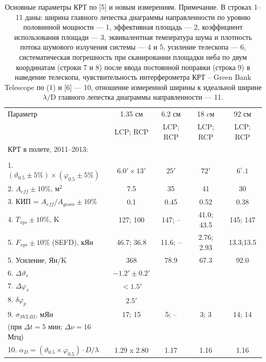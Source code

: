 \begin{table}
\caption{Основные параметры КРТ по [5] и новым измерениям.
\tiny{Примечание. В строках 1--11 даны: ширина главного лепестка диаграммы направленности по уровню
половинной мощности --- 1, эффективная площадь --- 2, коэффициент использования площади --- 3,
эквивалентная температура шума и плотность потока шумового излучения системы --- 4 и 5, усиление
телескопа --- 6, систематическая погрешность при сканировании площадки неба
по двум координатам (строки 7 и 8) после ввода постоянной поправки (строка 9) в наведение телескопа,
чувствительность интерферометра КРТ – Green Bank Telescope по (1) и [6] --- 10, отношение
измеренной ширины к идеальной ширине $\lambda/\text{D}$ главного лепестка диаграммы направленности
--- 11.}}
\bigskip
\label{tab:srt_params3}
\centering
    \begin{SingleSpace}
    \tiny
        \begin{tabular}{lcccc}
        \toprule
Параметр              & 1.35 см  & 6.2 см   & 18 cм    & 92 см\\
                      & LCP; RCP & LCP; RCP & LCP; RCP & LCP; RCP\\

        \midrule
КРТ в полете, 2011--2013: & & & &\\
                       & & & &\\
1. $(\vartheta_{0.5} \pm 5 \%) \times (\varphi_{0.5} \pm 5 \%)$ & $6.0' \times 13'$ & $25'$ &$72'$
 & $6^\circ.1$ \\
2. $A_{eff} \pm 10\%$, м$^2$                  & 7.5        & 35     & 41         & 30\\
3. КИП = $A_{eff}/A_{geom} \pm 10\%$          & 0.1        & 0.45   & 0.52       & 0.38\\
4. $T_{sys} \pm 10\%$, K                      & 127; 100   & 147;  -- & 41.0; 43.5 & 145; 147\\
5. $F_{sys} \pm 10\%$ (SEFD), кЯн             & 46.7; 36.8 & 11.6; --& 2.76; 2.93 & 13.3;13.5\\
5. Усиление, Ян/K                             & 368        &  78.9  & 67.3       & 92.0     \\
6. $\Delta \vartheta_s$  & $-1.2' \pm 0.2'$    & & & \\
7. $\Delta \varphi_s$    & $< 1.5'$            & & & \\
8. $\delta \varphi_p$    & $2.5'$              & & & \\
9. $\sigma_{SVLBI}$, мЯн          & 17; 15 &  5; --  & 3; 3    & 14; 14\\
   (при $\Delta t = 5$ мин; $\Delta \nu = 16$ Мгц)            &        &        &         &
\\
10. $\alpha_D = (\vartheta_{0.5} \times \varphi_{0.5}) \cdot D / \lambda$ &  1.29 x 2.80 & 1.17 &
1.16 & 1.16\\
        \bottomrule
        \end{tabular}
    \end{SingleSpace}
\end{table}

